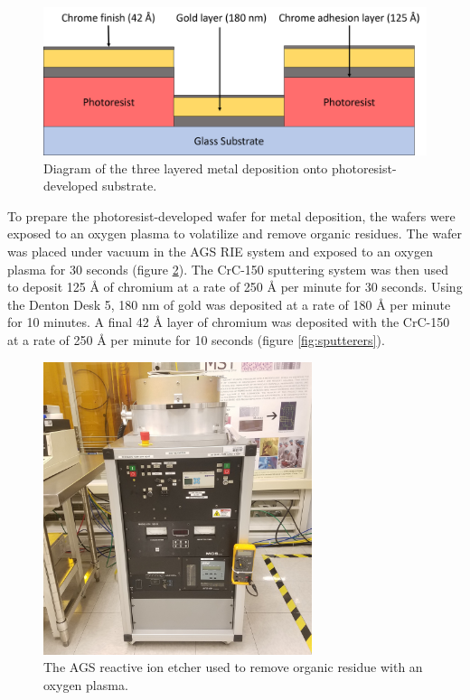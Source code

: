 \begin{figure}[h]
    \centering
    \includegraphics[width=\textwidth]{images/metal_deposition_diagram.png}
    \caption[Diagram of metal deposition onto photoresist-developed substrate]{Diagram of the three layered metal deposition onto photoresist-developed substrate.}
    \label{fig:metal_deposition}
\end{figure}

\par To prepare the photoresist-developed wafer for metal deposition, the wafers were exposed to an oxygen plasma to volatilize and remove organic residues. The wafer was placed under vacuum in the AGS RIE system and exposed to an oxygen plasma for 30 seconds (figure \ref{fig:AGS-RIE}). The CrC-150 sputtering system was then used to deposit 125 \si{\angstrom} of chromium at a rate of 250 \si{\angstrom} per minute for 30 seconds. Using the Denton Desk 5, 180 nm of gold was deposited at a rate of 180 \si{\angstrom} per minute for 10 minutes. A final 42 \si{\angstrom} layer of chromium was deposited with the CrC-150 at a rate of 250 \si{\angstrom} per minute for 10 seconds (figure \ref{fig:sputterers}). 

\begin{figure}[h]
    \centering
    \includegraphics[width=0.7\textwidth]{images/AGS_RIE.jpg}
    \caption[The AGS reactive ion etcher]{The AGS reactive ion etcher used to remove organic residue with an oxygen plasma.}
    \label{fig:AGS-RIE}
\end{figure}

